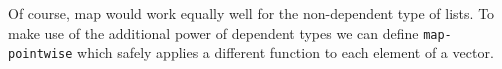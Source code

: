 Of course, map would work equally well for the non-dependent type of lists.
To make use of the additional power of dependent types we can define \texttt{map-pointwise}
which safely applies a different function to each element of a vector.
\begin{code}%
\>[0]\AgdaSpace{}%
\AgdaSymbol{:}%
\>[111I]\AgdaSymbol{\{}\AgdaSpace{}%
\AgdaSpace{}%
\AgdaSymbol{:}\AgdaSpace{}%
\AgdaSymbol{\}\{}\AgdaSpace{}%
\AgdaSymbol{:}\AgdaSpace{}%
\AgdaSymbol{\}}\AgdaSpace{}%
\<%
\\
\>[.][@{}l@{}]\<[111I]%
\>[16]\AgdaSpace{}%
\AgdaSymbol{(}\AgdaSpace{}%
\AgdaSpace{}%
\AgdaSymbol{)}\AgdaSpace{}%
\AgdaSpace{}%
\AgdaSpace{}%
\AgdaSpace{}%
\AgdaSpace{}%
\AgdaSpace{}%
\AgdaSpace{}%
\AgdaSpace{}%
\AgdaSpace{}%
\<%
\\
\>[0]\AgdaSpace{}%
\AgdaInductiveConstructor{[]}\AgdaSpace{}%
\AgdaInductiveConstructor{[]}\AgdaSpace{}%
\AgdaSymbol{=}\AgdaSpace{}%
\AgdaInductiveConstructor{[]}\<%
\\
\>[0]\AgdaSpace{}%
\AgdaSymbol{(}\AgdaSpace{}%
\AgdaOperator{\AgdaInductiveConstructor{::}}\AgdaSpace{}%
\AgdaSymbol{)}\AgdaSpace{}%
\AgdaSymbol{(}\AgdaSpace{}%
\AgdaOperator{\AgdaInductiveConstructor{::}}\AgdaSpace{}%
\AgdaSymbol{)}\AgdaSpace{}%
\AgdaSymbol{=}\AgdaSpace{}%
\AgdaSpace{}%
\AgdaSpace{}%
\AgdaOperator{\AgdaInductiveConstructor{::}}\AgdaSpace{}%
\AgdaSpace{}%
\AgdaSpace{}%
\<%
\end{code}

